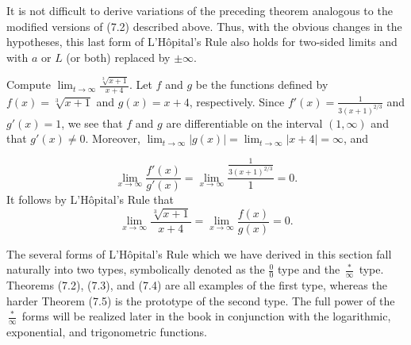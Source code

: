 It is not difficult to derive variations of the preceding theorem analogous to the modified versions of (7.2) described above. Thus, with the obvious changes in the hypotheses, this last form of L'H\^{o}pital's Rule also holds for two-sided limits and with $a$ or $L$ (or both) replaced by $\pm \infty$.

\begin{example}
Compute $\lim_{t \rightarrow \infty} \frac{\sqrt[3]{x + 1}}{x + 4} $. Let $f$ and $g$ be the functions  defined by $f(x) = \sqrt[3]{x + 1}$ and $g(x) = x + 4$, respectively. Since $f'(x) = \frac{1}{3(x + 1)^{2/3}}$ and $g'(x) = 1$, we see that $f$ and $g$ are differentiable on the interval $(1, \infty)$ and that $g'(x) \neq 0$. Moreover, $\lim_{t \rightarrow \infty} |g(x)| = \lim_{t \rightarrow \infty} |x + 4| = \infty$, and

$$
\lim_{x \rightarrow \infty} \frac{f'(x)}{g'(x)} = \lim_{x \rightarrow \infty} \frac{\frac{1}{3(x + 1)^{2/3}}}{1} = 0. 
$$
It follows by L'H\^{o}pital's Rule that 
$$
\lim_{x \rightarrow \infty}\frac{\sqrt[3]{x + 1}}{x + 4} = \lim_{x \rightarrow
\infty}\frac{f(x)}{g(x)} = 0.
$$

The several forms of L'H\^{o}pital's Rule which we have derived in this section fall naturally into two types, symbolically denoted as the $\frac{0}{0}$ type and the $\frac{*}{\infty}$ type. Theorems (7.2), (7.3), and (7.4) are all examples of the first type, whereas the harder Theorem (7.5) is the prototype of the second type. The full power of the $\frac{*}{\infty}$ forms will be realized later in the book in conjunction with the logarithmic, exponential, and trigonometric functions.
\end{example}

